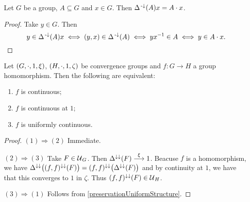 \begin{lemma} \label{deltaPreimageLemma}
Let $G$ be a group, $A\subseteq G$ and $x\in G$. Then $\Delta^{{\text{\hspace{0.15em}-}\downarrow}}(A)x = A\cdot x$.
\end{lemma}
\begin{proof}
Take $y\in G$. Then
\[ y\in \Delta^{{\text{\hspace{0.15em}-}\downarrow}}(A)x \iff (y,x)\in \Delta^{{\text{\hspace{0.15em}-}\downarrow}}(A) \iff yx^{-1}\in A \iff y\in A\cdot x. \]
\end{proof}

\begin{proposition} \label{uniformContinuityGroupHomomorphism}
Let $\left( G, \cdot, 1, \xi \right)$, $\left( H, \cdot, 1, \zeta \right)$ be convergence groups and $f: G\to H$ a group homomorphism. Then the following are equivalent:
\begin{enumerate}
\item $f$ is continuous;
\item $f$ is continuous at $1$;
\item $f$ is uniformly continuous.
\end{enumerate}
\end{proposition}
\begin{proof}
$(1)\Rightarrow (2)$ Immediate.

${(2)\Rightarrow (3)}$ Take $F\in \operatorname{\mathcal{U}}_G$. Then $\Delta^{\downarrow\downarrow}(F)\overset{\xi}{\longrightarrow} 1$. Beacuse $f$ is a homomorphism, we have $\Delta^{\downarrow\downarrow}\big((f,f)^{\downarrow\downarrow}(F)\big) = (f,f)^{\downarrow\downarrow}\big(\Delta^{\downarrow\downarrow}(F)\big)$ and by continuity at $1$, we have that this converges to $1$ in $\zeta$. Thus $(f,f)^{\downarrow\downarrow}(F)\in \operatorname{\mathcal{U}}_H$.

${(3)\Rightarrow (1)}$ Follows from \ref{preservationUniformStructure}.
\end{proof}

